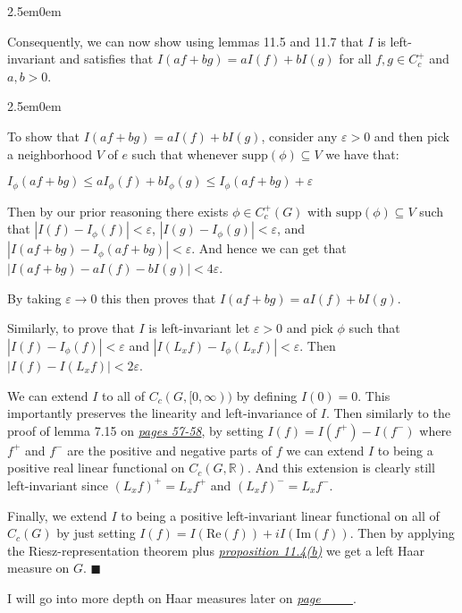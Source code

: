 \documentclass{book}
\newcommand{\inLinkRap}[2]{{\color{blue}\hyperlink{#1}{\textit{#2}}}}
\newcommand{\hTwo}{%
\color{Black}%
   \fontsize{13}{15}\selectfont%
}
\newcommand{\exPPP}{%
   \color{VioletRed}%
   \fontsize{12}{14}\selectfont%
}
\newenvironment{myIndent}{%
   \begin{adjustwidth}{2.5em}{0em}%
}{%
   \end{adjustwidth}%
}
\newcommand{\rea}[1]{\mathrm{Re}(#1)}
\newcommand{\ima}[1]{\mathrm{Im}(#1)}
\newcommand{\supp}{\mathrm{supp}}
\newcommand{\retTwo}{\hfill\bigbreak}
\begin{document}
\begin{myIndent}
	Consequently, we can now show using lemmas 11.5 and 11.7 that $I$ is left-invariant and satisfies that $I(af + bg) = aI(f) + bI(g)$ for all $f, g \in C_c^+$ and $a, b > 0$. 
	\begin{myIndent}\exPPP
		To show that $I(af + bg) = aI(f) + bI(g)$, consider any $\varepsilon > 0$ and then pick a neighborhood $V$ of $e$ such that whenever $\supp(\phi) \subseteq V$ we have that:

		{\centering $I_\phi(af + bg) \leq aI_\phi(f) + bI_\phi(g) \leq I_\phi(af + bg) + \varepsilon$ \retTwo\par}

		Then by our prior reasoning there exists $\phi \in C_c^+(G)$ with $\supp(\phi) \subseteq V$ such that $|I(f) - I_\phi(f)| < \varepsilon$, $|I(g) - I_\phi(g)| < \varepsilon$, and $|I(af + bg) - I_\phi(af + bg)| < \varepsilon$. And hence we can get that $|I(af + bg) - aI(f) - bI(g)| < 4\varepsilon$.\newpage

		By taking $\varepsilon \to 0$ this then proves that $I(af + bg) = aI(f) + bI(g)$.\retTwo

		Similarly, to prove that $I$ is left-invariant let $\varepsilon > 0$ and pick $\phi$ such that\\ $|I(f) - I_\phi(f)| < \varepsilon$ and $|I(L_x f) - I_\phi(L_x f)| < \varepsilon$. Then $|I(f) - I(L_x f)| < 2\varepsilon$.\retTwo
	\end{myIndent}

	We can extend $I$ to all of $C_c(G, [0, \infty))$ by defining $I(0) = 0$. This importantly preserves the linearity and left-invariance of $I$. Then similarly to the proof of lemma 7.15 on \inLinkRap{Folland Lemma 7.15 reference}{pages 57-58}, by setting $I(f) = I(f^+) - I(f^-)$ where $f^+$ and $f^-$ are the positive and negative parts of $f$ we can extend $I$ to being a positive real linear functional on $C_c(G, \mathbb{R})$. And this extension is clearly still left-invariant since $(L_x f)^+ = L_x f^+$ and $(L_x f)^- = L_x f^-$.\retTwo

	Finally, we extend $I$ to being a positive left-invariant linear functional on all of $C_c(G)$ by just setting $I(f) = I(\rea{f}) + iI(\ima{f})$. Then by applying the Riesz-representation theorem plus \inLinkRap{Folland Proposition 11.4(b)}{proposition 11.4(b)} we get a left Haar measure on $G$. $\blacksquare$\retTwo
\end{myIndent}

\hTwo I will go into more depth on Haar measures later on \inLinkRap{idk reference 6}{page \_\_\_}.
\end{document}
